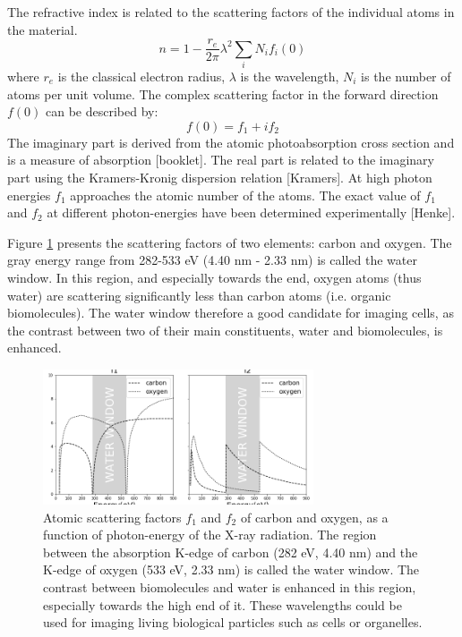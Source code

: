 The refractive index is related to the scattering factors of the individual atoms in the material.
\begin{equation}
n = 1-\frac{r_e}{2\pi} \lambda^{2} \sum_{i} N_i f_i(0)
\end{equation}
where $r_e$ is the classical electron radius, $\lambda$ is the wavelength, $N_i$ is the number of atoms per unit volume. The complex scattering factor in the forward direction $f(0)$ can be described by: 
\begin{equation}
f(0) = f_1 + i f_2
\end{equation}
The imaginary part is derived from the atomic photoabsorption cross section and is a measure of absorption [booklet]. The real part is related to the imaginary part using the Kramers-Kronig dispersion relation [Kramers]. At high photon energies $f_1$ approaches the atomic number of the atoms. The exact value of $f_1$ and $f_2$ at different photon-energies have been determined experimentally [Henke]. 

Figure \ref{fig:waterwindow} presents the scattering factors of two elements: carbon and oxygen. The gray energy range from 282-533 eV (4.40 nm - 2.33 nm) is called the water window. In this region, and especially towards the end, oxygen atoms (thus water) are scattering significantly less than carbon atoms (i.e. organic biomolecules). The water window therefore a good candidate for imaging cells, as the contrast between two of their main constituents, water and biomolecules, is enhanced.

\begin{figure}[h]\label{fig:waterwindow}
\centering 
\includegraphics[width=80mm]{waterwindow.png}

\caption{Atomic scattering factors $f_1$ and $f_2$ of carbon and oxygen, as a function of photon-energy of the X-ray radiation. The region between the absorption K-edge of carbon (282 eV, 4.40 nm) and the K-edge of oxygen (533 eV, 2.33 nm) is called the water window.  The contrast between biomolecules and water is enhanced in this region, especially towards the high end of it. These wavelengths could be used for imaging living biological particles such as cells or organelles.}
\end{figure}

